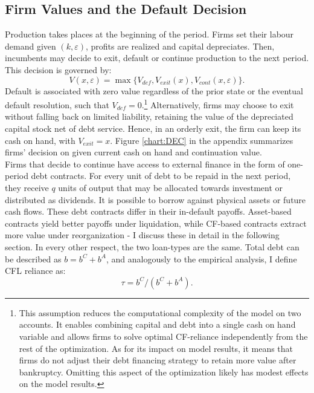 \documentclass[12pt]{article}
\begin{document}
\subsection{Firm Values and the Default Decision \label{defaults}} 
Production takes places at the beginning of the period. Firms set their labour demand given $(k,\varepsilon)$, profits are realized and capital depreciates. Then, incumbents may decide to exit, default or continue production to the next period. This decision is governed by: 
\begin{equation} \label{eq:default decision}
    V(x,\varepsilon) = \max \{ V_{def}, V_{exit}(x), V_{cont}(x,\varepsilon) \}.
\end{equation}
Default is associated with zero value regardless of the prior state or the eventual default resolution, such that $V_{def} = 0$.\footnote{This assumption reduces the computational complexity of the model on two accounts. It enables combining capital and debt into a single cash on hand variable and allows firms to solve optimal CF-reliance independently from the rest of the optimization. As for its impact on model results, it means that firms do not adjust their debt financing strategy to retain more value after bankruptcy. Omitting this aspect of the optimization likely has modest effects on the model results.} Alternatively, firms may choose to exit without falling back on limited liability, retaining the value of the depreciated capital stock net of debt service. Hence, in an orderly exit, the firm can keep its cash on hand, with $V_{exit} = x$. Figure \ref{chart:DEC} in the appendix summarizes firms' decision on given current cash on hand and continuation value. \vspace{3mm} \\
Firms that decide to continue have access to external finance in the form of one-period debt contracts. For every unit of debt to be repaid in the next period, they receive $q$ units of output that may be allocated towards investment or distributed as dividends. It is possible to borrow against physical assets or future cash flows. These debt contracts differ in their in-default payoffs. Asset-based contracts yield better payoffs under liquidation, while CF-based contracts extract more value under reorganization - I discuss these in detail in the following section. In every other respect, the two loan-types are the same. Total debt can be described as $b = b^C+b^A$, and analogously to the empirical analysis, I define CFL reliance as: 
\begin{equation}
    \tau = b^C/(b^C+b^A).
\end{equation}
\end{document}
